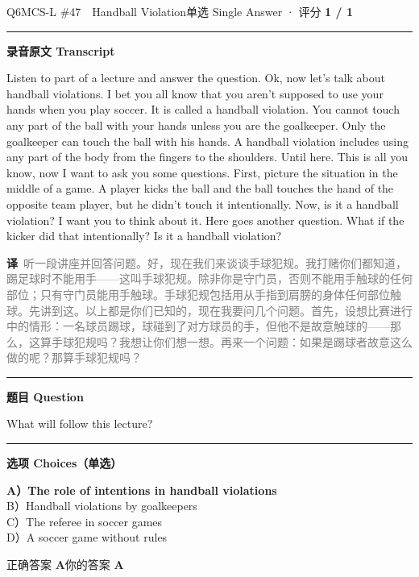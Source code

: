 \documentclass[11pt]{article}
\newcommand{\ptesub}[1]{%
  \par\needspace{2\baselineskip}\smallskip
  {\color{cAccent}\rule[-0.2ex]{3pt}{1.05em}}\hspace{6pt}%
  {\bfseries\color{cHead}#1}\par\nopagebreak\smallskip}
\newcommand{\zh}[1]{{\footnotesize\textcolor{cNote}{\textbf{译}}\ \textcolor{gray}{#1}}}
\begin{document}
\begin{qblock}{Q6\quad MCS-L \#47\ \ Handball Violation}{单选 Single Answer · 评分 \textcolor{cAccent}{\bfseries 1 / 1}}
\ptesub{录音原文 Transcript}
\begin{promptbox}
Listen to part of a lecture and answer the question. Ok, now let's talk about handball violations. I bet you all know that you aren't supposed to use your hands when you play soccer. It is called a handball violation. You cannot touch any part of the ball with your hands unless you are the goalkeeper. Only the goalkeeper can touch the ball with his hands. A handball violation includes using any part of the body from the fingers to the shoulders. Until here. This is all you know, now I want to ask you some questions. First, picture the situation in the middle of a game. A player kicks the ball and the ball touches the hand of the opposite team player, but he didn't touch it intentionally. Now, is it a handball violation? I want you to think about it. Here goes another question. What if the kicker did that intentionally? Is it a handball violation?
\end{promptbox}
\zh{听一段讲座并回答问题。好，现在我们来谈谈手球犯规。我打赌你们都知道，踢足球时不能用手——这叫手球犯规。除非你是守门员，否则不能用手触球的任何部位；只有守门员能用手触球。手球犯规包括用从手指到肩膀的身体任何部位触球。先讲到这。以上都是你们已知的，现在我要问几个问题。首先，设想比赛进行中的情形：一名球员踢球，球碰到了对方球员的手，但他不是故意触球的——那么，这算手球犯规吗？我想让你们想一想。再来一个问题：如果是踢球者故意这么做的呢？那算手球犯规吗？}
\ptesub{题目 Question}
\begin{notebox}\small What will follow this lecture?\end{notebox}
\ptesub{选项 Choices（单选）}
{\small
{\color{cFix}\textbf{A）The role of intentions in handball violations}}\\
B）Handball violations by goalkeepers\\
C）The referee in soccer games\\
D）A soccer game without rules}
\smallskip\par
{\small 正确答案 \textcolor{cFix}{\bfseries A}\qquad 你的答案 \textcolor{cFix}{\bfseries A}}
\end{qblock}
\end{document}
